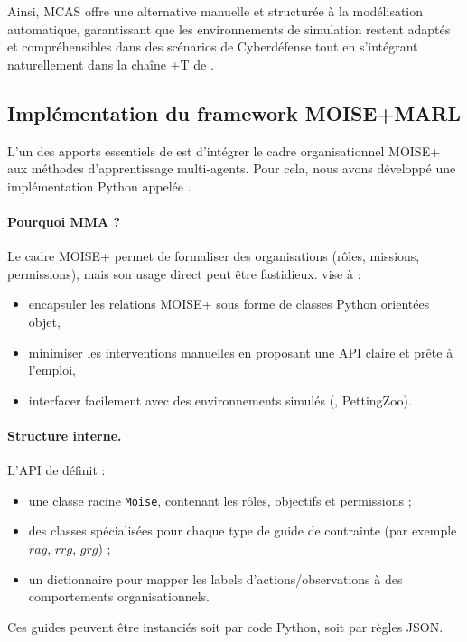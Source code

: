 Ainsi, MCAS offre une alternative manuelle et structurée à la modélisation automatique, garantissant que les environnements de simulation restent adaptés et compréhensibles dans des scénarios de Cyberdéfense tout en s'intégrant naturellement dans la chaîne +T de .


\subsection{Implémentation du framework MOISE+MARL}

L'un des apports essentiels de \footnotemark[1] est d'intégrer le cadre organisationnel MOISE+ aux méthodes d'apprentissage multi-agents. Pour cela, nous avons développé une implémentation Python appelée \footnotemark[2].



\paragraph{Pourquoi MMA ?}
Le cadre MOISE+ permet de formaliser des organisations (rôles, missions, permissions), mais son usage direct peut être fastidieux.  vise à :
\begin{itemize}
  \item encapsuler les relations MOISE+ sous forme de classes Python orientées objet,
  \item minimiser les interventions manuelles en proposant une API claire et prête à l'emploi,
  \item interfacer facilement avec des environnements simulés (, PettingZoo).
\end{itemize}

\paragraph{Structure interne.}
L'API de  définit :
\begin{itemize}
  \item une classe racine \texttt{Moise}, contenant les rôles, objectifs et permissions ;
  \item des classes spécialisées pour chaque type de guide de contrainte (par exemple $rag$, $rrg$, $grg$) ;
  \item un dictionnaire pour mapper les labels d'actions/observations à des comportements organisationnels.
\end{itemize}
Ces guides peuvent être instanciés soit par code Python, soit par règles JSON.


